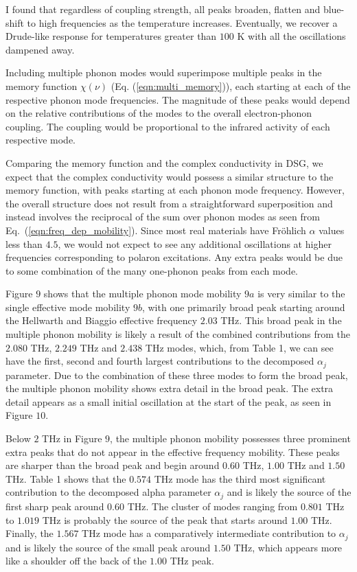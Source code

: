I found that regardless of coupling strength, all peaks broaden, flatten and blue-shift to high frequencies as the temperature increases. Eventually, we recover a Drude-like response for temperatures greater than $100$ K with all the oscillations dampened away. 

Including multiple phonon modes would superimpose multiple peaks in the memory function $\chi(\nu)$ (Eq. (\ref{eqn:multi_memory})), each starting at each of the respective phonon mode frequencies. The magnitude of these peaks would depend on the relative contributions of the modes to the overall electron-phonon coupling. The coupling would be proportional to the infrared activity of each respective mode. 

Comparing the memory function and the complex conductivity in DSG, we expect that the complex conductivity would possess a similar structure to the memory function, with peaks starting at each phonon mode frequency. However, the overall structure does not result from a straightforward superposition and instead involves the reciprocal of the sum over phonon modes as seen from Eq.~(\ref{eqn:freq_dep_mobility}). Since most real materials have Fr\"ohlich $\alpha$ values less than $4.5$, we would not expect to see any additional oscillations at higher frequencies corresponding to polaron excitations. Any extra peaks would be due to some combination of the many one-phonon peaks from each mode. 

Figure $9$ shows that the multiple phonon mode mobility $9a$ is very similar to the single effective mode mobility $9b$, with one primarily broad peak starting around the Hellwarth and Biaggio effective frequency $2.03$ THz. This broad peak in the multiple phonon mobility is likely a result of the combined contributions from the $2.080$ THz, $2.249$ THz and $2.438$ THz modes, which, from Table 1, we can see have the first, second and fourth largest contributions to the decomposed $\alpha_j$ parameter. Due to the combination of these three modes to form the broad peak, the multiple phonon mobility shows extra detail in the broad peak. The extra detail appears as a small initial oscillation at the start of the peak, as seen in Figure $10$. 

Below $2$ THz in Figure $9$, the multiple phonon mobility possesses three prominent extra peaks that do not appear in the effective frequency mobility. These peaks are sharper than the broad peak and begin around $0.60$ THz, $1.00$ THz and $1.50$ THz. Table 1 shows that the $0.574$ THz mode has the third most significant contribution to the decomposed alpha parameter $\alpha_j$ and is likely the source of the first sharp peak around $0.60$ THz. The cluster of modes ranging from $0.801$ THz to $1.019$ THz is probably the source of the peak that starts around $1.00$ THz. Finally, the $1.567$ THz mode has a comparatively intermediate contribution to $\alpha_j$ and is likely the source of the small peak around $1.50$ THz, which appears more like a shoulder off the back of the $1.00$ THz peak.

